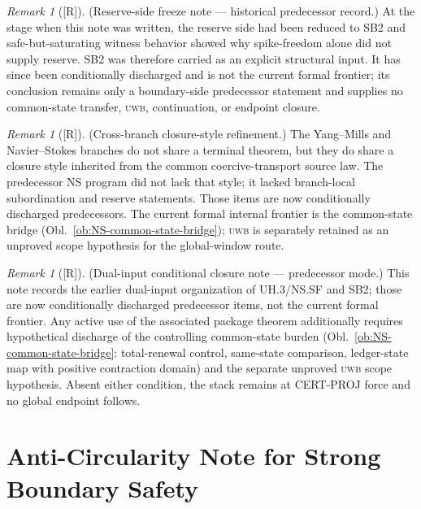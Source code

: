 \documentclass[12pt,oneside]{amsbook}
\theoremstyle{plain}
\theoremstyle{definition}
\theoremstyle{remark}
\newtheorem{remark}[theorem]{Remark}
\newcommand{\status}[1]{\textup{[#1]}}
\begin{document}
\begin{remark}[\status{R}]\label{rmk:SB2Freeze}
\textup{(Reserve-side freeze note --- historical predecessor record.)}
At the stage when this note was written, the reserve side had been
reduced to SB2 and safe-but-saturating witness behavior showed why
spike-freedom alone did not supply reserve. SB2 was therefore carried
as an explicit structural input. It has since been conditionally
discharged and is not the current formal frontier; its conclusion
remains only a boundary-side predecessor statement and supplies no
common-state transfer, \textsc{uwb}, continuation, or endpoint
closure.
\end{remark}

\begin{remark}[\status{R}]\label{rmk:NSXB2}
\textup{(Cross-branch closure-style refinement.)}
The Yang--Mills and Navier--Stokes branches do not share a terminal
theorem, but they do share a closure style inherited from the common
coercive-transport source law. The predecessor NS program did not
lack that style; it lacked branch-local subordination and reserve
statements. Those items are now conditionally discharged
predecessors. The current formal internal frontier is the common-state
bridge (Obl.~\ref{ob:NS-common-state-bridge}); \textsc{uwb} is
separately retained as an unproved scope hypothesis for the
global-window route.
\end{remark}

\begin{remark}[\status{R}]\label{rmk:NSDualInput}
\textup{(Dual-input conditional closure note --- predecessor mode.)}
This note records the earlier dual-input organization of UH.3/NS.SF
and SB2; those are now conditionally discharged predecessor items,
not the current formal frontier. Any active use of the associated
package theorem additionally requires hypothetical discharge of the
controlling common-state burden
(Obl.~\ref{ob:NS-common-state-bridge}: total-renewal control,
same-state comparison, ledger-state map with positive contraction
domain) and the separate unproved \textsc{uwb} scope hypothesis.
Absent either condition, the stack remains at CERT-PROJ force and no
global endpoint follows.
\end{remark}

\section{Anti-Circularity Note for Strong Boundary Safety}
\end{document}
